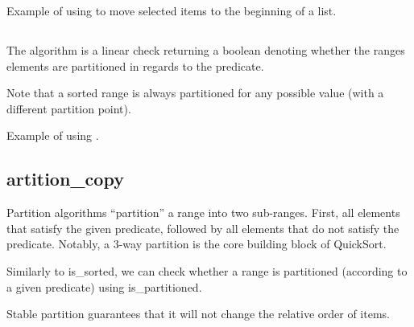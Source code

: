 
\begin{box-note}
\footnotesize Example of using  to move selected items to the beginning of a list.
\tcblower
{}
\end{box-note}

\subsection{\texorpdfstring{}{\texttt{std::is\_partitioned}}}

The  algorithm is a linear check returning a boolean denoting whether the ranges elements are partitioned in regards to the predicate.


Note that a sorted range is always partitioned for any possible value (with a different partition point).

\begin{box-note}
\footnotesize Example of using .
\tcblower
{}
\end{box-note}


\subsection{artition\_copy}

Partition algorithms “partition” a range into two sub-ranges. First, all elements that satisfy the given predicate, followed by all elements that do not satisfy the predicate. Notably, a 3-way partition is the core building block of QuickSort.



Similarly to is\_sorted, we can check whether a range is partitioned (according to a given predicate) using is\_partitioned.




Stable partition guarantees that it will not change the relative order of items.



